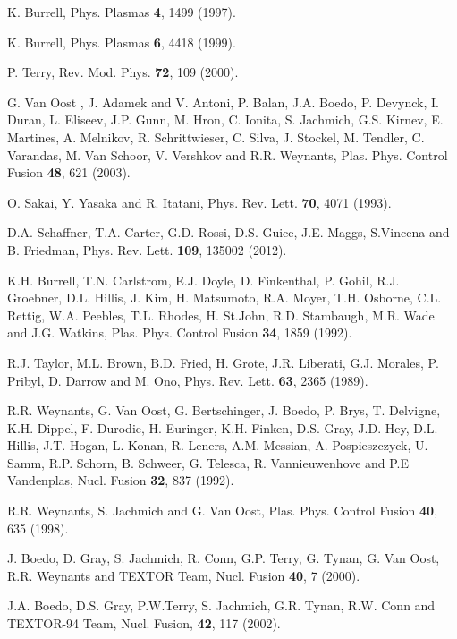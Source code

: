 \documentclass[aip,pop,amsmath,amssymb,reprint,superscriptaddress]{revtex4-1} %
\begin{document}
\providecommand{\noopsort}[1]{}\providecommand{\singleletter}[1]{#1}%
\begin{thebibliography}{10}

K. Burrell, Phys. Plasmas {\bf 4},  1499  (1997).

K. Burrell, Phys. Plasmas {\bf 6},  4418  (1999).

P. Terry, Rev. Mod. Phys. {\bf 72},  109  (2000).

G. Van Oost , J. Adamek and V. Antoni, P. Balan, J.A. Boedo, P. Devynck, I. Duran, L. Eliseev, J.P. Gunn, M. Hron, C. Ionita, S. Jachmich, G.S. Kirnev, E. Martines, A. Melnikov, R. Schrittwieser, C. Silva, J. Stockel, M. Tendler, C. Varandas, M. Van Schoor, V. Vershkov and R.R. Weynants, Plas. Phys. Control Fusion {\bf 48}, 621 (2003).

O. Sakai, Y. Yasaka and R. Itatani, Phys. Rev. Lett. {\bf 70},  4071 (1993).

D.A. Schaffner, T.A. Carter, G.D. Rossi, D.S. Guice, J.E. Maggs, S.Vincena and B. Friedman, Phys. Rev. Lett. {\bf 109}, 135002 (2012).

K.H. Burrell, T.N. Carlstrom, E.J. Doyle, D. Finkenthal, P. Gohil, R.J. Groebner, D.L. Hillis, J. Kim, H. Matsumoto, R.A. Moyer, T.H. Osborne, C.L. Rettig, W.A. Peebles, T.L. Rhodes, H. St.John, R.D. Stambaugh, M.R. Wade and J.G. Watkins, Plas. Phys. Control Fusion {\bf 34}, 1859 (1992). 

R.J. Taylor, M.L. Brown, B.D. Fried, H. Grote, J.R. Liberati, G.J. Morales, P. Pribyl, D. Darrow and M. Ono, Phys. Rev. Lett. {\bf 63},  2365  (1989).

R.R. Weynants, G. Van Oost, G. Bertschinger, J. Boedo, P. Brys, T. Delvigne, K.H. Dippel, F. Durodie, H. Euringer, K.H. Finken, D.S. Gray, J.D. Hey, D.L. Hillis, J.T. Hogan, L. Konan, R. Leners, A.M. Messian, A. Pospieszczyck, U. Samm, R.P. Schorn, B. Schweer, G. Telesca, R. Vannieuwenhove and P.E Vandenplas, Nucl. Fusion {\bf 32},  837  (1992).

R.R. Weynants, S. Jachmich and G. Van Oost, Plas. Phys. Control Fusion {\bf 40}, 635 (1998).

J. Boedo, D. Gray, S. Jachmich, R. Conn, G.P. Terry, G. Tynan, G. Van Oost, R.R. Weynants and TEXTOR Team, Nucl. Fusion {\bf 40},  7  (2000).

J.A. Boedo, D.S. Gray, P.W.Terry, S. Jachmich, G.R. Tynan, R.W. Conn and TEXTOR-94 Team, Nucl. Fusion, {\bf 42}, 117 (2002).



\end{thebibliography}
\end{document}
